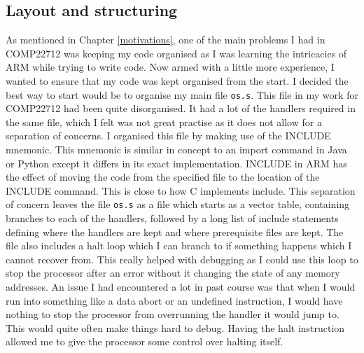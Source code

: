 \subsection{Layout and structuring}
As mentioned in Chapter \ref{motivations}, one of the main problems I had in COMP22712 was keeping my code organised as I was learning the intricacies of ARM while trying to write code. Now armed with a little more experience, I wanted to ensure that my code was kept organised from the start. I decided the best way to start would be to organise my main file \verb|os.s|. This file in my work for COMP22712 had been quite disorganised. It had a lot of the handlers required in the same file, which I felt was not great practise as it does not allow for a separation of concerns. I organised this file by making use of the INCLUDE mnemonic. This mnemonic is similar in concept to an import command in Java or Python except it differs in its exact implementation. INCLUDE in ARM has the effect of moving the code from the specified file to the location of the INCLUDE command. This is close to how C implements include. %
This separation of concern leaves the file \verb|os.s| as a file which starts as a vector table, containing branches to each of the handlers, followed by a long list of include statements defining where the handlers are kept and where prerequisite files are kept. The file also includes a halt loop which I can branch to if something happens which I cannot recover from. This really helped with debugging as I could use this loop to stop the processor after an error without it changing the state of any memory addresses. An issue I had encountered a lot in past course was that when I would run into something like a data abort or an undefined instruction, I would have nothing to stop the processor from overrunning the handler it would jump to. This would quite often make things hard to debug. Having the halt instruction allowed me to give the processor some control over halting itself.
